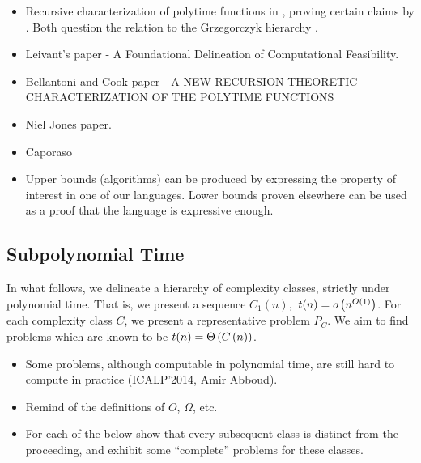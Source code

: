\begin{itemize}

\item Recursive characterization of polytime functions in \cite{rose-1984},
proving certain claims by \cite{cobham-1965}. Both question the relation to the
Grzegorczyk hierarchy \cite{grzegorczyk-1953}.

\item Leivant's paper - A Foundational Delineation of Computational Feasibility.

\item Bellantoni and Cook paper - A NEW RECURSION-THEORETIC CHARACTERIZATION OF
THE POLYTIME FUNCTIONS

\item Niel Jones paper.

\item Caporaso

\item Upper bounds (algorithms) can be produced by expressing the property of
interest in one of our languages. Lower bounds proven elsewhere can be used as
a proof that the language is expressive enough.

\end{itemize}

\subsection{Subpolynomial Time}

In what follows, we delineate a hierarchy of complexity classes, strictly under
polynomial time. That is, we present a sequence $C_1(n),$ $t(n)=o\left({n^{O\left({1}\right)}}\right)$. For each
complexity class $C$, we present a representative problem $P_C$. We aim to find
problems which are known to be $t(n)=\Theta\left({C\left({n}\right)}\right)$.

\begin{itemize}

\item Some problems, although computable in polynomial time, are still hard to
compute in practice (ICALP'2014, Amir Abboud).

\item Remind of the definitions of $O$, $\Omega$, etc.

\item For each of the below show that every subsequent class is distinct from
the proceeding, and exhibit some ``complete'' problems for these classes.

\end{itemize}

